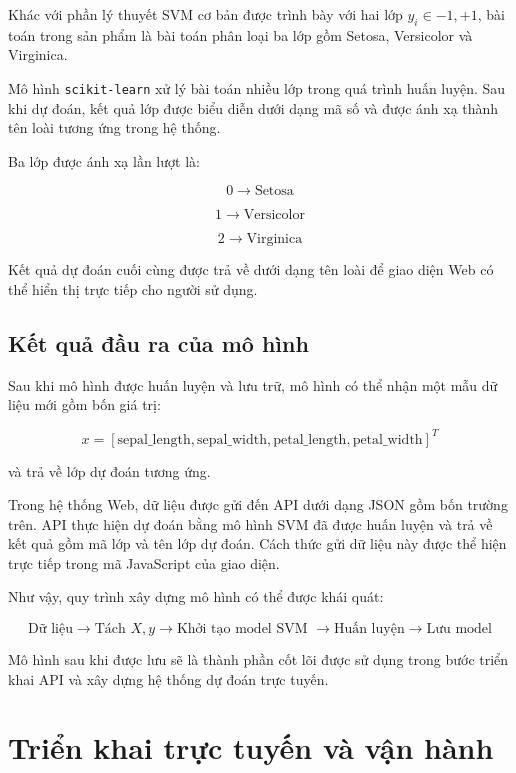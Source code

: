 \documentclass[12pt,a4paper]{report}
\begin{document}
		Khác với phần lý thuyết SVM cơ bản được trình bày với hai lớp
		$y_i\in{-1,+1}$, bài toán trong sản phẩm là bài toán phân loại ba lớp gồm
		Setosa, Versicolor và Virginica.
		
		Mô hình  \texttt{scikit-learn} xử lý bài toán nhiều lớp trong quá trình huấn luyện. Sau khi dự đoán, kết quả lớp được biểu diễn dưới dạng mã số và được ánh xạ thành tên loài tương ứng trong hệ thống.
		
		\noindent
		Ba lớp được ánh xạ lần lượt là:
		
		$$
		0\rightarrow\text{Setosa}
		$$
		
		$$
		1\rightarrow\text{Versicolor}
		$$
		
		$$
		2\rightarrow\text{Virginica}
		$$
		
		Kết quả dự đoán cuối cùng được trả về dưới dạng tên loài để giao diện Web có thể hiển thị trực tiếp cho người sử dụng.
		
		\section{Kết quả đầu ra của mô hình}
		
		Sau khi mô hình được huấn luyện và lưu trữ, mô hình có thể nhận một mẫu dữ liệu	mới gồm bốn giá trị:
		
		$$
		x=
		\left[
		\text{sepal\_length},
		\text{sepal\_width},
		\text{petal\_length},
		\text{petal\_width}
		\right]^T
		$$
		
		và trả về lớp dự đoán tương ứng.
		
		Trong hệ thống Web, dữ liệu được gửi đến API dưới dạng JSON gồm bốn trường trên. API thực hiện dự đoán bằng mô hình SVM đã được huấn luyện và trả về kết
		quả gồm mã lớp và tên lớp dự đoán. Cách thức gửi dữ liệu này được thể hiện trực tiếp trong mã JavaScript của giao diện.
		
		\noindent
		Như vậy, quy trình xây dựng mô hình có thể được khái quát:
		
		$$
		\text{Dữ liệu}
		\rightarrow
		\text{Tách }X,y
		\rightarrow
		\text{Khởi tạo model SVM }
		\rightarrow
		\text{Huấn luyện}
		\rightarrow
		\text{Lưu model}
		$$
		
		Mô hình sau khi được lưu sẽ là thành phần cốt lõi được sử dụng trong bước triển khai API và xây dựng hệ thống dự đoán trực tuyến.
	
	\chapter{Triển khai trực tuyến và vận hành}	
	
\end{document}
